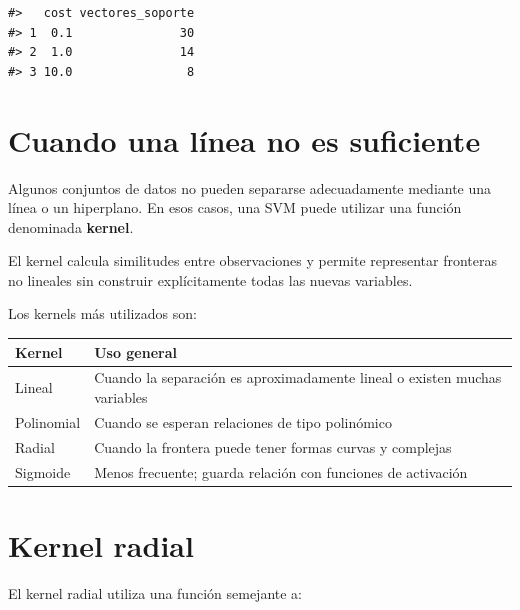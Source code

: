 \documentclass[
  spanish,
  10.5pt,
  letterpaper,
  openany,
  headings=big]{scrbook}
\newcounter{none} %
\begin{document}
\begin{verbatim}
#>   cost vectores_soporte
#> 1  0.1               30
#> 2  1.0               14
#> 3 10.0                8
\end{verbatim}

\section{Cuando una línea no es
suficiente}\label{cuando-una-luxednea-no-es-suficiente}

Algunos conjuntos de datos no pueden separarse adecuadamente mediante
una línea o un hiperplano. En esos casos, una SVM puede utilizar una
función denominada \textbf{kernel}.

El kernel calcula similitudes entre observaciones y permite representar
fronteras no lineales sin construir explícitamente todas las nuevas
variables.

Los kernels más utilizados son:

{\def\LTcaptype{none} %
\begin{longtable}[]{@{}
  >{\raggedright\arraybackslash}p{}
  >{\raggedright\arraybackslash}p{}@{}}
\toprule\noalign{}
\begin{minipage}[b]{\linewidth}\raggedright
Kernel
\end{minipage} & \begin{minipage}[b]{\linewidth}\raggedright
Uso general
\end{minipage} \\
\midrule\noalign{}
\endhead
\bottomrule\noalign{}
\endlastfoot
Lineal & Cuando la separación es aproximadamente lineal o existen muchas
variables \\
Polinomial & Cuando se esperan relaciones de tipo polinómico \\
Radial & Cuando la frontera puede tener formas curvas y complejas \\
Sigmoide & Menos frecuente; guarda relación con funciones de
activación \\
\end{longtable}
}

\section{Kernel radial}\label{kernel-radial}

El kernel radial utiliza una función semejante a:
\end{document}
